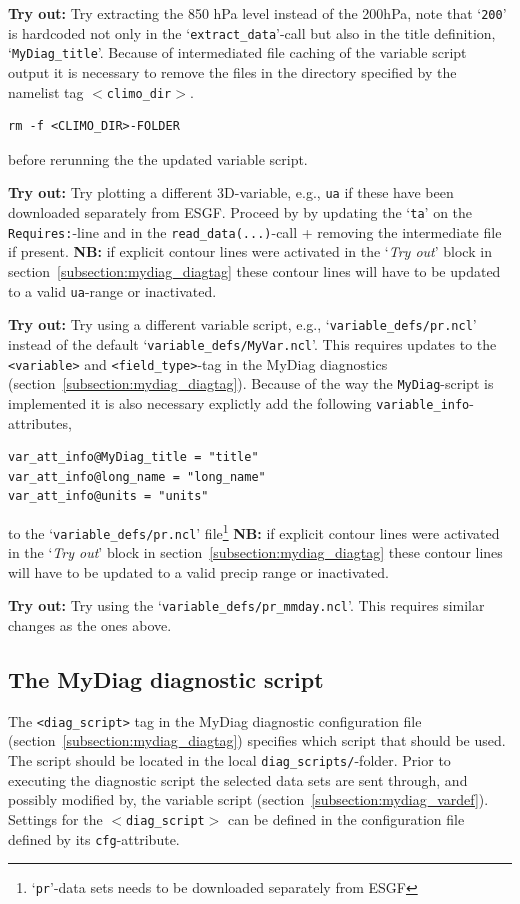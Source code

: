 \documentclass[12pt]{article}
\newcommand{\xmltag}[1]{\texttt{$<$#1$>$}}
\begin{document}
\textbf{Try out:} Try extracting the 850 hPa level instead of the
200hPa, note that `\texttt{200}' is hardcoded not only in the
`\texttt{extract\_data}'-call but also in the title definition,
`\texttt{MyDiag\_title}'. Because of intermediated file caching of the
variable script output it is necessary to remove the files in the
directory specified by the namelist tag \xmltag{climo\_dir}.
\begin{Verbatim}[frame=single, fontsize=\footnotesize]
rm -f <CLIMO_DIR>-FOLDER
\end{Verbatim}
before rerunning the the updated variable script. 

\textbf{Try out:} Try plotting a different 3D-variable, e.g.,
\texttt{ua} if these have been downloaded separately from
ESGF\cite{esgf}. Proceed by by updating the `\texttt{ta}' on the
\texttt{Requires:}-line and in the \texttt{read\_data(...)}-call +
removing the intermediate file if present. \textbf{NB:} if explicit
contour lines were activated in the `\emph{Try out}' block in
section~\ref{subsection:mydiag_diagtag} these contour lines will have
to be updated to a valid \texttt{ua}-range or inactivated.

\textbf{Try out:} Try using a different variable script, e.g.,
`\texttt{variable\_defs/pr.ncl}' instead of the default
`\texttt{variable\_defs/MyVar.ncl}'. This requires updates to the
\texttt{<variable>} and \texttt{<field\_type>}-tag in the MyDiag
diagnostics (section~\ref{subsection:mydiag_diagtag}). Because of the
way the \texttt{MyDiag}-script is implemented it is also necessary
explictly add the following \texttt{variable\_info}-attributes, 
\begin{Verbatim}[frame=single, fontsize=\footnotesize]
var_att_info@MyDiag_title = "title"
var_att_info@long_name = "long_name"
var_att_info@units = "units"
\end{Verbatim}
to the `\texttt{variable\_defs/pr.ncl}' file\footnote{`\texttt{pr}'-data sets
needs to be downloaded separately from ESGF\cite{esgf}} \textbf{NB:} if
explicit contour lines were activated in the `\emph{Try out}' block in
section~\ref{subsection:mydiag_diagtag} these contour lines will have to be
updated to a valid precip range or inactivated.

\textbf{Try out:} Try using the
`\texttt{variable\_defs/pr\_mmday.ncl}'. This requires similar changes
as the ones above.

\subsection{The MyDiag diagnostic script}\label{subsection:mydiag_diagnostic}
The \texttt{<diag\_script>} tag in the MyDiag diagnostic configuration
file (section~\ref{subsection:mydiag_diagtag}) specifies which script
that should be used. The script should be located in the local
\texttt{diag\_scripts/}-folder. Prior to executing the diagnostic
script the selected data sets are sent through, and possibly modified
by, the variable script (section~\ref{subsection:mydiag_vardef}).
Settings for the \xmltag{diag\_script} can be defined in the
configuration file defined by its \texttt{cfg}-attribute.
\end{document}
